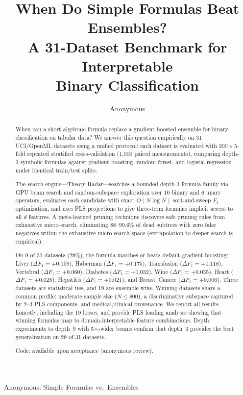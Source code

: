 \documentclass[journal]{IEEEtran}
\begin{document}
\title{When Do Simple Formulas Beat Ensembles?\\
A 31-Dataset Benchmark for Interpretable\\Binary Classification}

\author{Anonymous}

{Anonymous: Simple Formulas vs.\ Ensembles}

\maketitle

\begin{abstract}
When can a short algebraic formula replace a gradient-boosted
ensemble for binary classification on tabular data?  We answer this
question empirically on 31 UCI/OpenML datasets using a unified
protocol: each dataset is evaluated with $200 \times 5$-fold
repeated stratified cross-validation (1{,}000 paired measurements),
comparing depth-3 symbolic formulas against gradient boosting,
random forest, and logistic regression under identical train/test
splits.

The search engine---Theory Radar---searches a bounded depth-3
formula family via GPU beam search and random-subspace exploration
over 10 binary and 6 unary operators, evaluates each candidate with
exact $O(N \log N)$ sort-and-sweep $F_1$ optimization, and uses PLS
projections to give three-term formulas implicit access to all $d$
features.  A meta-learned pruning
technique discovers safe pruning rules from exhaustive micro-search,
eliminating 88--99.6\% of dead subtrees with zero false negatives
within the exhaustive micro-search space (extrapolation to deeper
search is empirical).

On 9 of 31 datasets (29\%), the formula matches or beats default
gradient boosting: Liver ($\Delta F_1 = {+}0.159$), Haberman
($\Delta F_1 = {+}0.175$), Transfusion ($\Delta F_1 = {+}0.118$),
Vertebral ($\Delta F_1 = {+}0.060$), Diabetes
($\Delta F_1 = {+}0.032$), Wine ($\Delta F_1 = {+}0.035$), Heart
($\Delta F_1 = {+}0.028$), Hepatitis ($\Delta F_1 = {+}0.021$),
and Breast~Cancer ($\Delta F_1 = {+}0.006$).  Three datasets are
statistical ties, and 19 are ensemble wins.  Winning datasets share
a common profile: moderate sample size ($N \leq 800$), a
discriminative subspace captured by 2--3 PLS components, and
medical/clinical provenance.  We report all results honestly,
including the 19 losses, and provide PLS loading analyses showing
that winning formulas map to domain-interpretable feature
combinations.  Depth experiments to depth~9 with 5$\times$-wider
beams confirm that depth~3 provides the best generalization on
29 of 31 datasets.

Code: available upon acceptance (anonymous review).
\end{abstract}
\end{document}
